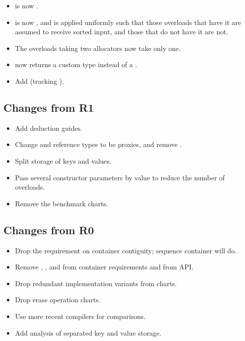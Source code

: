 \begin{itemize}
  \item {} is now .
  \item {} is now , and
    is applied uniformly such that those overloads that have it are assumed to
    receive sorted input, and those that do not have it are not.
  \item The overloads taking two allocators now take only one.
  \item {} now returns a custom type instead of a .
  \item Add  (tracking ).
\end{itemize}

\subsection{Changes from R1}

\begin{itemize}
  \item Add deduction guides.
  \item Change  and reference types to be proxies, and remove
    .
  \item Split storage of keys and values.
  \item Pass several constructor parameters by value to reduce the number of overloads.
  \item Remove the benchmark charts.
\end{itemize}

\subsection{Changes from R0}

\begin{itemize}
  \item Drop the requirement on container contiguity; sequence container will
    do.
  \item Remove , , and 
    from container requirements and from  API.
  \item Drop redundant implementation variants from charts.
  \item Drop erase operation charts.
  \item Use more recent compilers for comparisons.
  \item Add analysis of separated key and value storage.
\end{itemize}

